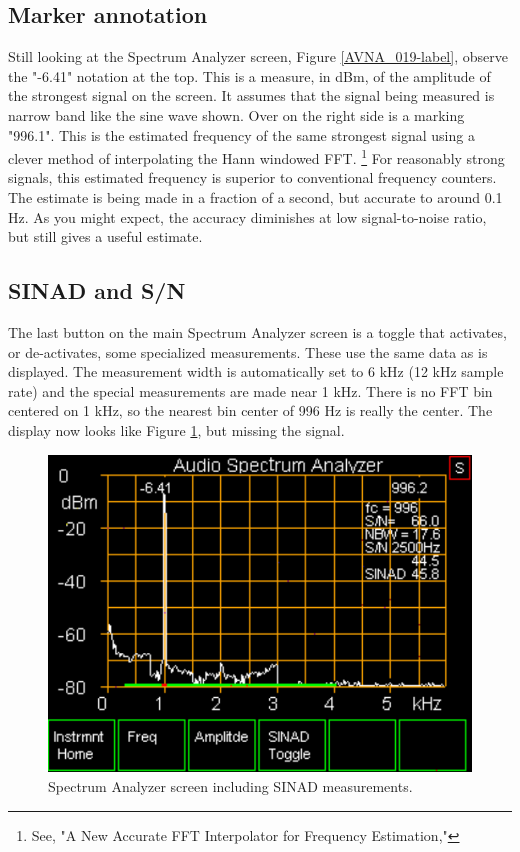 \subsection{Marker annotation} Still looking at the Spectrum Analyzer screen, Figure  \ref{AVNA_019-label},  observe the "\textsf{-6.41}" notation at the top.  This is a measure, in dBm, of the amplitude of the strongest signal on the screen.  It assumes that the signal being measured is narrow band like the sine wave shown.  Over on the right side is a marking "\textsf{996.1}".  This is the estimated frequency of the same strongest signal using a clever method of interpolating the Hann windowed FFT.  \footnote{See, "A New Accurate FFT Interpolator for Frequency Estimation," }
%
For reasonably strong signals, this estimated frequency is superior to conventional frequency counters. The estimate is being made in a fraction of a second, but accurate to around 0.1 Hz.   As you might expect, the accuracy diminishes at low signal-to-noise ratio, but still gives a useful estimate.

\subsection{SINAD and S/N} The last button on the main Spectrum Analyzer screen is a toggle that activates, or de-activates, some specialized measurements.  These use the same data as is displayed.  The measurement width is automatically set to 6 kHz (12 kHz sample rate) and the special measurements are made near 1 kHz.  There is no FFT bin centered on 1 kHz, so the nearest bin center of 996 Hz is really the center.  The display now looks like Figure \ref{AVNA_020-label}, but missing the signal.
%
\begin{figure}[H]
\begin{center}
\includegraphics[scale=0.75]{./images/AVNA_020.pdf}
\caption{Spectrum Analyzer screen including SINAD measurements.}
\label{AVNA_020-label}
\end{center}
\end{figure}
%

